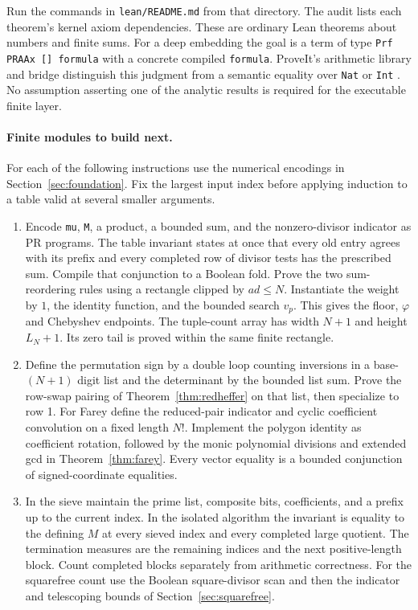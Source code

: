 Run the commands in \texttt{lean/README.md} from that directory. The audit lists each theorem's kernel axiom dependencies. These are ordinary Lean theorems about numbers and finite sums. For a deep embedding the goal is a term of type \texttt{Prf PRAAx [] formula} with a concrete compiled \texttt{formula}. ProveIt's arithmetic library and bridge distinguish this judgment from a semantic equality over \texttt{Nat} or \texttt{Int} \cite{repo}. No assumption asserting one of the analytic results is required for the executable finite layer.

\paragraph{Finite modules to build next.}
For each of the following instructions use the numerical encodings in Section~\ref{sec:foundation}. Fix the largest input index before applying induction to a table valid at several smaller arguments.
\begin{enumerate}
\item Encode \texttt{mu}, \texttt{M}, a product, a bounded sum, and the nonzero-divisor indicator as PR programs. The table invariant states at once that every old entry agrees with its prefix and every completed row of divisor tests has the prescribed sum. Compile that conjunction to a Boolean fold. Prove the two sum-reordering rules using a rectangle clipped by $ad\le N$. Instantiate the weight by $1$, the identity function, and the bounded search $v_p$. This gives the floor, $\varphi$ and Chebyshev endpoints. The tuple-count array has width $N+1$ and height $L_N+1$. Its zero tail is proved within the same finite rectangle.
\item Define the permutation sign by a double loop counting inversions in a base-$(N+1)$ digit list and the determinant by the bounded list sum. Prove the row-swap pairing of Theorem~\ref{thm:redheffer} on that list, then specialize to row 1. For Farey define the reduced-pair indicator and cyclic coefficient convolution on a fixed length $N!$. Implement the polygon identity as coefficient rotation, followed by the monic polynomial divisions and extended gcd in Theorem~\ref{thm:farey}. Every vector equality is a bounded conjunction of signed-coordinate equalities.
\item In the sieve maintain the prime list, composite bits, coefficients, and a prefix up to the current index. In the isolated algorithm the invariant is equality to the defining $M$ at every sieved index and every completed large quotient. The termination measures are the remaining indices and the next positive-length block. Count completed blocks separately from arithmetic correctness. For the squarefree count use the Boolean square-divisor scan and then the indicator and telescoping bounds of Section~\ref{sec:squarefree}.
\end{enumerate}

